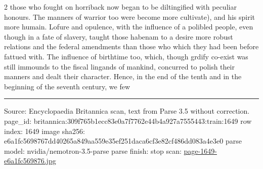 \documentclass[10pt]{article}
\begin{document}
\begin{multicols}{2}
those who fought on horriback now began to be diltingified with peculiar honours. The manners of warrior too were become more cultivate), and his spirit more humain. Lofure and opulence, with the influence of a polibled people, even though in a fate of slavery, taught those habenam to a desire more robust relations and the federal amendments than those who which they had been before fattued with. The influence of birthtime too, which, though grdify co-exist was still immounds to the fiscal lingands of mankind, concurred to polish their manners and dealt their character. Hence, in the end of the tenth and in the beginning of the seventh century, we few

\end{multicols}
\vfill\par\noindent\rule{\linewidth}{0.4pt}\par
{\scriptsize\color{gray}\noindent Source: Encyclopaedia Britannica scan, text from Parse 3.5 without correction. page\_id: britannica:309f765b1ecc83e0a7f7762e44b4a927a7555443:train:1649 \quad row index: 1649 \quad image sha256: e6a1fc5698767dd40265a849aa559e35ef251daca6cf3e82cf486dd083a4e3e0 \quad parse model: nvidia/nemotron-3.5-parse \quad parse finish: stop \quad scan: \href{../scans/page-1649-e6a1fc569876.jpg}{page-1649-e6a1fc569876.jpg}\par}
\end{document}
